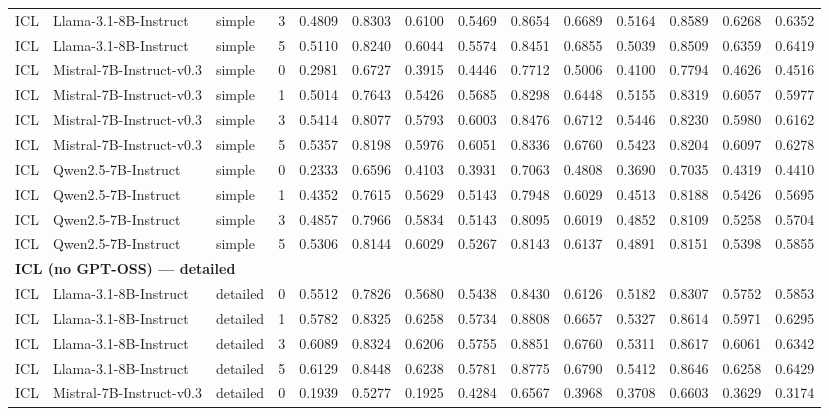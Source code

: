 \begin{longtable}{l l l r r r r r r r r r r r}
ICL & Llama-3.1-8B-Instruct & simple & 3 & 0.4809 & 0.8303 & 0.6100 & 0.5469 & 0.8654 & 0.6689 & 0.5164 & 0.8589 & 0.6268 & 0.6352 \\
ICL & Llama-3.1-8B-Instruct & simple & 5 & 0.5110 & 0.8240 & 0.6044 & 0.5574 & 0.8451 & 0.6855 & 0.5039 & 0.8509 & 0.6359 & 0.6419 \\
ICL & Mistral-7B-Instruct-v0.3 & simple & 0 & 0.2981 & 0.6727 & 0.3915 & 0.4446 & 0.7712 & 0.5006 & 0.4100 & 0.7794 & 0.4626 & 0.4516 \\
ICL & Mistral-7B-Instruct-v0.3 & simple & 1 & 0.5014 & 0.7643 & 0.5426 & 0.5685 & 0.8298 & 0.6448 & 0.5155 & 0.8319 & 0.6057 & 0.5977 \\
ICL & Mistral-7B-Instruct-v0.3 & simple & 3 & 0.5414 & 0.8077 & 0.5793 & 0.6003 & 0.8476 & 0.6712 & 0.5446 & 0.8230 & 0.5980 & 0.6162 \\
ICL & Mistral-7B-Instruct-v0.3 & simple & 5 & 0.5357 & 0.8198 & 0.5976 & 0.6051 & 0.8336 & 0.6760 & 0.5423 & 0.8204 & 0.6097 & 0.6278 \\
ICL & Qwen2.5-7B-Instruct & simple & 0 & 0.2333 & 0.6596 & 0.4103 & 0.3931 & 0.7063 & 0.4808 & 0.3690 & 0.7035 & 0.4319 & 0.4410 \\
ICL & Qwen2.5-7B-Instruct & simple & 1 & 0.4352 & 0.7615 & 0.5629 & 0.5143 & 0.7948 & 0.6029 & 0.4513 & 0.8188 & 0.5426 & 0.5695 \\
ICL & Qwen2.5-7B-Instruct & simple & 3 & 0.4857 & 0.7966 & 0.5834 & 0.5143 & 0.8095 & 0.6019 & 0.4852 & 0.8109 & 0.5258 & 0.5704 \\
ICL & Qwen2.5-7B-Instruct & simple & 5 & 0.5306 & 0.8144 & 0.6029 & 0.5267 & 0.8143 & 0.6137 & 0.4891 & 0.8151 & 0.5398 & 0.5855 \\
\hline\hline
\multicolumn{14}{l}{\textbf{ICL (no GPT-OSS) — detailed}} \\
\hline
ICL & Llama-3.1-8B-Instruct & detailed & 0 & 0.5512 & 0.7826 & 0.5680 & 0.5438 & 0.8430 & 0.6126 & 0.5182 & 0.8307 & 0.5752 & 0.5853 \\
ICL & Llama-3.1-8B-Instruct & detailed & 1 & 0.5782 & 0.8325 & 0.6258 & 0.5734 & 0.8808 & 0.6657 & 0.5327 & 0.8614 & 0.5971 & 0.6295 \\
ICL & Llama-3.1-8B-Instruct & detailed & 3 & 0.6089 & 0.8324 & 0.6206 & 0.5755 & 0.8851 & 0.6760 & 0.5311 & 0.8617 & 0.6061 & 0.6342 \\
ICL & Llama-3.1-8B-Instruct & detailed & 5 & 0.6129 & 0.8448 & 0.6238 & 0.5781 & 0.8775 & 0.6790 & 0.5412 & 0.8646 & 0.6258 & 0.6429 \\
ICL & Mistral-7B-Instruct-v0.3 & detailed & 0 & 0.1939 & 0.5277 & 0.1925 & 0.4284 & 0.6567 & 0.3968 & 0.3708 & 0.6603 & 0.3629 & 0.3174 \\

\end{longtable}
